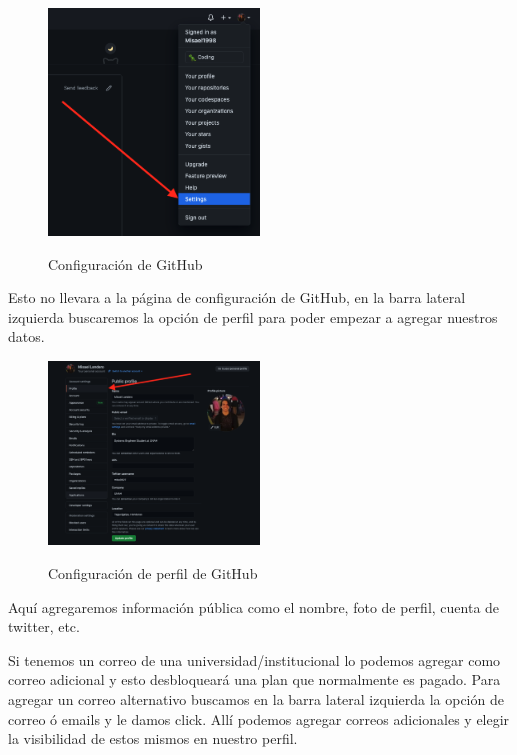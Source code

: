 \documentclass[11pt, oneside]{article}
\begin{document}
\begin{figure}[H]
  \centering
  \caption{Configuración de GitHub}
  \includegraphics[width=0.50\textwidth]{./img/github-settings-1.png}
  \label{fig:github-settings-1}
\end{figure}

Esto no llevara a la página de configuración de GitHub, en la barra lateral izquierda buscaremos la opción de perfil para poder empezar a agregar nuestros datos.

\begin{figure}[H]
  \centering
  \caption{Configuración de perfil de GitHub}
  \includegraphics[width=0.50\textwidth]{./img/github-settings-2.png}
  \label{fig:github-settings-2}
\end{figure}

Aquí agregaremos información pública como el nombre, foto de perfil, cuenta de twitter, etc.

Si tenemos un correo de una universidad/institucional lo podemos agregar como correo adicional y esto desbloqueará una plan que normalmente es pagado. Para agregar un correo alternativo buscamos en la barra lateral izquierda la opción de correo ó emails y le damos click. Allí podemos agregar correos adicionales y elegir la visibilidad de estos mismos en nuestro perfil.
\end{document}
